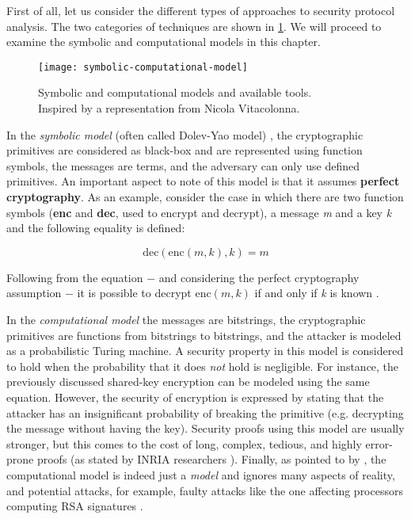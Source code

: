 First of all, let us consider the different types of approaches to security protocol analysis. The two categories of techniques are shown in \cref{fig:symbolic-computational-model}. We will proceed to examine the symbolic and computational models in this chapter.

\begin{figure}[t]
    \texttt{[image: symbolic-computational-model]}
    \centering
    \caption{Symbolic and computational models and available tools.\\Inspired by a representation from Nicola Vitacolonna.}
    \label{fig:symbolic-computational-model}
\end{figure}

In the \textit{symbolic model} (often called Dolev-Yao model) \cite{Dolev-Yao}, the cryptographic primitives are considered as black-box and are represented using function symbols, the messages are terms, and the adversary can only use defined primitives. An important aspect to note of this model is that it assumes \textbf{perfect cryptography}. As an example, consider the case in which there are two function symbols (\textbf{enc} and \textbf{dec}, used to encrypt and decrypt), a message \textit{m} and a key \textit{k} and the following equality is defined:

\begin{equation}
    \mbox{dec}\left(\mbox{enc}\left(m, k\right), k\right) = m
\end{equation}

Following from the equation $-$ and considering the perfect cryptography assumption $-$ it is possible to decrypt $\mbox{enc}\left(m, k\right)$ if and only if \textit{k} is known \cite{SymbolicComputationalBlanchet}.

In the \textit{computational model} the messages are bitstrings, the cryptographic primitives are functions from bitstrings to bitstrings, and the attacker is modeled as a probabilistic Turing machine.
A security property in this model is considered to hold when the probability that it does \textit{not} hold is negligible. For instance, the previously discussed shared-key encryption can be modeled using the same equation. However, the security of encryption is expressed by stating that the attacker has an insignificant probability of breaking the primitive (e.g. decrypting the message without having the key). Security proofs using this model are usually stronger, but this comes to the cost of long, complex, tedious, and highly error-prone proofs (as stated by INRIA researchers \cite{ComputationalAnalysisCryptoSystemsINRIA}). Finally, as pointed to by \BLANC{} \cite{SymbolicComputationalBlanchet}, the computational model is indeed just a \textit{model} and ignores many aspects of reality, and potential attacks, for example, faulty attacks like the one affecting processors computing RSA signatures \cite{RSAFaultAttack}.

